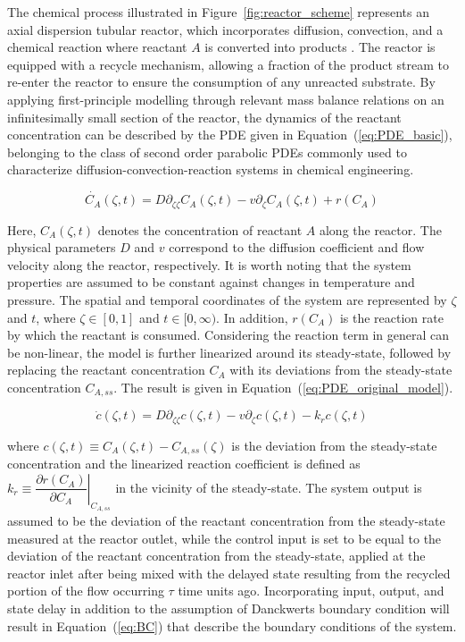 The chemical process illustrated in Figure~\ref{fig:reactor_scheme} represents an axial dispersion tubular reactor, which incorporates diffusion, convection, and a chemical reaction where reactant $A$ is converted into products \autocite{levenspiel1998chemical}. The reactor is equipped with a recycle mechanism, allowing a fraction of the product stream to re-enter the reactor to ensure the consumption of any unreacted substrate. By applying first-principle modelling through relevant mass balance relations on an infinitesimally small section of the reactor, the dynamics of the reactant concentration can be described by the PDE given in Equation~(\ref{eq:PDE_basic}), belonging to the class of second order parabolic PDEs commonly used to characterize diffusion-convection-reaction systems \autocite{jensen1982bifurcation} in chemical engineering.

\begin{equation} \label{eq:PDE_basic}
    \dot{C_A}(\zeta, t) = D \partial_{\zeta \zeta} C_A(\zeta, t) - v \partial_\zeta C_A(\zeta, t) + r(C_A)
\end{equation}

Here, $C_A(\zeta, t)$ denotes the concentration of reactant $A$ along the reactor. The physical parameters $D$ and $v$ correspond to the diffusion coefficient and flow velocity along the reactor, respectively. It is worth noting that the system properties are assumed to be constant against changes in temperature and pressure. The spatial and temporal coordinates of the system are represented by $\zeta$ and $t$, where $\zeta \in [0, 1]$ and $t \in [0, \infty)$. In addition, $r(C_A)$ is the reaction rate by which the reactant is consumed. Considering the reaction term in general can be non-linear, the model is further linearized around its steady-state, followed by replacing the reactant concentration $C_A$ with its deviations from the steady-state concentration $C_{A,ss}$. The result is given in Equation~(\ref{eq:PDE_original_model}).

\begin{equation} \label{eq:PDE_original_model}
    \dot{c}(\zeta, t) = D \partial_{\zeta \zeta} c(\zeta, t) - v \partial_\zeta c(\zeta, t) - k_r c(\zeta, t)
\end{equation}

where $c(\zeta, t) \equiv C_A(\zeta, t) - C_{A, ss}(\zeta)$ is the deviation from the steady-state concentration and the linearized reaction coefficient is defined as $k_r \equiv \left. \dfrac{\partial r(C_A)}{\partial C_A} \right|_{C_{A, ss}}$ in the vicinity of the steady-state. The system output is assumed to be the deviation of the reactant concentration from the steady-state measured at the reactor outlet, while the control input is set to be equal to the deviation of the reactant concentration from the steady-state, applied at the reactor inlet after being mixed with the delayed state resulting from the recycled portion of the flow occurring $\tau$ time units ago. Incorporating input, output, and state delay in addition to the assumption of Danckwerts boundary condition will result in Equation~(\ref{eq:BC}) that describe the boundary conditions of the system.

